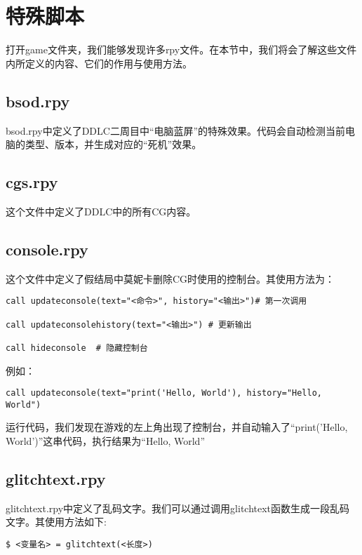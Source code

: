 \section{特殊脚本}

打开game文件夹，我们能够发现许多rpy文件。在本节中，我们将会了解这些文件内所定义的内容、它们的作用与使用方法。

\subsection{bsod.rpy}

bsod.rpy中定义了DDLC二周目中“电脑蓝屏”的特殊效果。代码会自动检测当前电脑的类型、版本，并生成对应的“死机”效果。


\subsection{cgs.rpy}

这个文件中定义了DDLC中的所有CG内容。


\subsection{console.rpy}

这个文件中定义了假结局中莫妮卡删除CG时使用的控制台。其使用方法为：
\begin{lstlisting}
call updateconsole(text="<命令>", history="<输出>")# 第一次调用

call updateconsolehistory(text="<输出>") # 更新输出

call hideconsole  # 隐藏控制台
\end{lstlisting}

例如：
\begin{lstlisting}
call updateconsole(text="print('Hello, World'), history="Hello, World")
\end{lstlisting}

运行代码，我们发现在游戏的左上角出现了控制台，并自动输入了“print('Hello, World')”这串代码，执行结果为“Hello, World”

\subsection{glitchtext.rpy}

glitchtext.rpy中定义了乱码文字。我们可以通过调用glitchtext函数生成一段乱码文字。其使用方法如下:
\begin{lstlisting}
$ <变量名> = glitchtext(<长度>)
\end{lstlisting}


